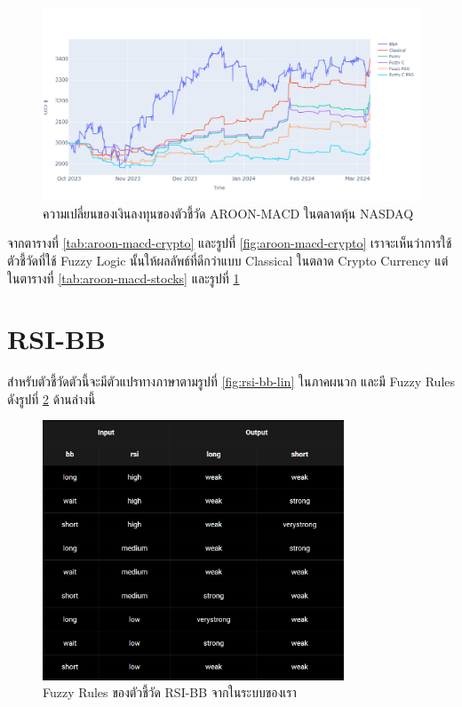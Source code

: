 \begin{figure}[!h]
    \centering
    \includegraphics[width=\textwidth]{images/aroon-macd/stock-result.png}
    \caption{ความเปลี่ยนของเงินลงทุนของตัวชี้วัด AROON-MACD ในตลาดหุ้น NASDAQ}
    \label{fig:aroon-macd-stock}
\end{figure}

จากตารางที่ \ref{tab:aroon-macd-crypto} และรูปที่ \ref{fig:aroon-macd-crypto} เราจะเห็นว่าการใช้ตัวชี้วัดที่ใช้ Fuzzy Logic นั้นให้ผลลัพธ์ที่ดีกว่าแบบ Classical ในตลาด Crypto Currency แต่ในตารางที่ \ref{tab:aroon-macd-stocks} และรูปที่ \ref{fig:aroon-macd-stock}

\section{RSI-BB}
สำหรับตัวชี้วัดตัวนี้จะมีตัวแปรทางภาษาตามรูปที่ \ref{fig:rsi-bb-lin} ในภาคผนวก และมี Fuzzy Rules ดังรูปที่ \ref{fig:rsi-bb-rules} ด้านล่างนี้
\begin{figure}[!ht]
    \centering
    \includegraphics[width=0.8\textwidth]{images/rsi-bb-rules.png}
    \caption{Fuzzy Rules ของตัวชี้วัด RSI-BB จากในระบบของเรา}
    \label{fig:rsi-bb-rules}
\end{figure}

